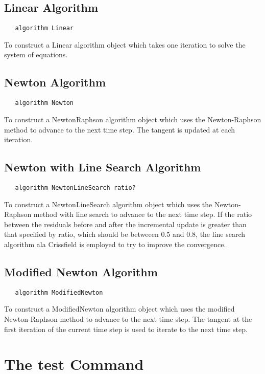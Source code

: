 \documentclass[12pt]{article}
\begin{document}
\subsection {Linear Algorithm}
{\sf\small
\begin{verbatim}
   algorithm Linear
\end{verbatim}
}

To construct a Linear algorithm object which takes one iteration to solve
the system of equations.

\subsection {Newton Algorithm}
{\sf\small
\begin{verbatim}
   algorithm Newton
\end{verbatim}
}

To construct a NewtonRaphson algorithm object which uses the Newton-Raphson
method to advance to the next time step. The tangent is updated at
each iteration.


\subsection {Newton with Line Search Algorithm}
{\sf\small
\begin{verbatim}
   algorithm NewtonLineSearch ratio?
\end{verbatim}
}

To construct a NewtonLineSearch algorithm object which uses the Newton-Raphson
method with line search to advance to the next time step. If the
ratio between the residuals before and after the incremental update
is greater than that specified by ratio, which should be betweeen 0.5
and 0.8, the line search algorithm ala Crissfield is employed to try
to improve the convergence. 

\subsection {Modified Newton Algorithm}
{\sf\small
\begin{verbatim}
   algorithm ModifiedNewton
\end{verbatim}
}

To construct a ModifiedNewton algorithm object which uses the modified Newton-Raphson
method to advance to the next time step. The tangent at the first iteration of the current
time step is used to iterate to the next time step.

\section {The test Command}
\end{document}
